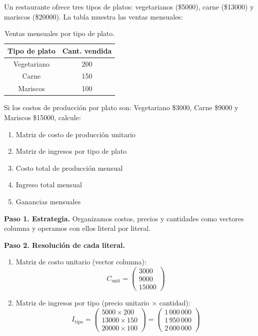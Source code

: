 \begin{prob} 
Un restaurante ofrece tres tipos de platos: vegetarianos (\$5000), carne (\$13000) y mariscos (\$20000). La tabla muestra las ventas mensuales:

\begin{table}[H]\centering
\begin{tabular}{|c||c|}\hline
Tipo de plato & Cant. vendida \\\hline
Vegetariano & 200 \\
Carne & 150 \\
Mariscos & 100 \\\hline
\end{tabular}
\caption{Ventas mensuales por tipo de plato.}
\end{table}

Si los costos de producción por plato son: Vegetariano \$3000, Carne \$9000 y Mariscos \$15000, calcule:
\begin{enumerate}[$(a)$]
\item Matriz de costo de producción unitario
\item Matriz de ingresos por tipo de plato
\item Costo total de producción mensual
\item Ingreso total mensual
\item Ganancias mensuales
\end{enumerate}

\begin{myproof}
\textbf{Paso 1. Estrategia.} Organizamos costos, precios y cantidades como vectores columna y operamos con ellos literal por literal.

\textbf{Paso 2. Resolución de cada literal.}
\begin{enumerate}[$(a)$]
\item Matriz de costo unitario (vector columna):
\[
C_{\text{unit}} = \boxed{\begin{pmatrix}
3000 \\
9000 \\
15000
\end{pmatrix}}
\]

\item Matriz de ingresos por tipo (precio unitario $\times$ cantidad):
\[
I_{\text{tipo}} = \begin{pmatrix}
5000 \times 200 \\
13000 \times 150 \\
20000 \times 100
\end{pmatrix} = \boxed{\begin{pmatrix}
1\,000\,000 \\
1\,950\,000 \\
2\,000\,000
\end{pmatrix}}
\]


\end{enumerate}
\end{myproof}
\end{prob}
